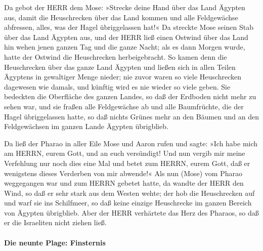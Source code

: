  Da gebot der HERR dem Mose: »Strecke deine Hand über das
Land Ägypten aus, damit die Heuschrecken über das Land kommen und alle
Feldgewächse abfressen, alles, was der Hagel übriggelassen hat!«
 Da streckte Mose seinen Stab über das Land Ägypten aus,
und der HERR ließ einen Ostwind über das Land hin wehen jenen ganzen Tag
und die ganze Nacht; als es dann Morgen wurde, hatte der Ostwind die
Heuschrecken herbeigebracht.  So kamen denn die
Heuschrecken über das ganze Land Ägypten und ließen sich in allen Teilen
Ägyptens in gewaltiger Menge nieder; nie zuvor waren so viele
Heuschrecken dagewesen wie damals, und künftig wird es nie wieder so
viele geben.  Sie bedeckten die Oberfläche des ganzen
Landes, so daß der Erdboden nicht mehr zu sehen war, und sie fraßen alle
Feldgewächse ab und alle Baumfrüchte, die der Hagel übriggelassen hatte,
so daß nichts Grünes mehr an den Bäumen und an den Feldgewächsen im
ganzen Lande Ägypten übrigblieb.

 Da ließ der Pharao in aller Eile Mose und Aaron rufen
und sagte: »Ich habe mich am HERRN, eurem Gott, und an euch versündigt!
 Und nun vergib mir meine Verfehlung nur noch dies eine
Mal und betet zum HERRN, eurem Gott, daß er wenigstens dieses Verderben
von mir abwende!«  Als nun (Mose) vom Pharao weggegangen
war und zum HERRN gebetet hatte,  da wandte der HERR den
Wind, so daß er sehr stark aus dem Westen wehte; der hob die
Heuschrecken auf und warf sie ins Schilfmeer, so daß keine einzige
Heuschrecke im ganzen Bereich von Ägypten übrigblieb. 
Aber der HERR verhärtete das Herz des Pharaos, so daß er die Israeliten
nicht ziehen ließ.

\hypertarget{die-neunte-plage-finsternis}{%
\paragraph{Die neunte Plage:
Finsternis}\label{die-neunte-plage-finsternis}}


